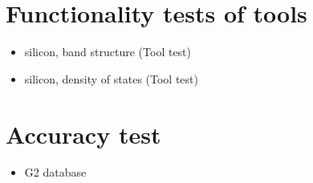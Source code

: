 \documentclass[11pt,a4paper]{report}
\begin{document}
\section{Functionality tests of tools}

\begin{itemize}
\item silicon, band structure (Tool test)
\item silicon, density of states (Tool test)
\end{itemize}

\section{Accuracy test}
\begin{itemize}
\item G2 database
\end{itemize}


\clearpage


\end{document}

